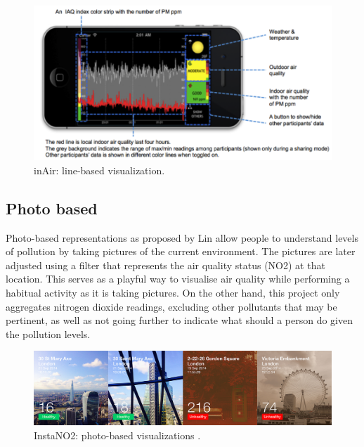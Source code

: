 \begin{figure}[H]
\begin{adjustbox}{width=1\textwidth,center=\textwidth}
  \centering
  \includegraphics[scale=1]{images/InAir.png}
\end{adjustbox}
  \caption[inAir project: line-based visualizations]{inAir: line-based visualization\cite{Kim2013}.}
  \label{fig:line_based_inAir}
\end{figure}


\subsection{Photo based}
Photo-based representations as proposed by Lin \cite{Lin2014} allow people to understand levels of pollution by taking pictures of the current environment. The pictures are later adjusted using a filter that represents the air quality status (NO2) at that location. This serves as a playful way to visualise air quality while performing a habitual activity as it is taking pictures. On the other hand, this project only aggregates nitrogen dioxide readings, excluding other pollutants that may be pertinent, as well as not going further to indicate what should a person do given the pollution levels.

\begin{figure}[H]
\begin{adjustbox}{width=.8\textwidth,center=\textwidth}
  \centering
  \includegraphics[scale=.4]{images/instaNO2.jpg}
\end{adjustbox}
  \caption[InstaNO2 project: photo-based visualizations]{InstaNO2: photo-based visualizations \cite{Lin2014}.}
  \label{fig:photo_based_instaNO2}
\end{figure}

